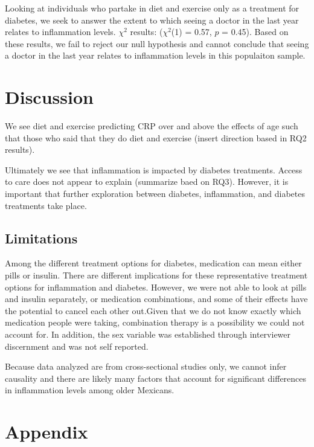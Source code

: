 \documentclass[
  man]{apa6}
\begin{document}
Looking at individuals who partake in diet and exercise only as a treatment for diabetes, we seek to answer the extent to which seeing a doctor in the last year relates to inflammation levels. \(\chi^2\) results: (\(\chi^2\)(1) = 0.57, \(p\) = 0.45). Based on these results, we fail to reject our null hypothesis and cannot conclude that seeing a doctor in the last year relates to inflammation levels in this populaiton sample.

\hypertarget{discussion}{%
\section{Discussion}\label{discussion}}

We see diet and exercise predicting CRP over and above the effects of age such that those who said that they do diet and exercise (insert direction based in RQ2 results).

Ultimately we see that inflammation is impacted by diabetes treatments. Access to care does not appear to explain (summarize baed on RQ3). However, it is important that further exploration between diabetes, inflammation, and diabetes treatments take place.

\hypertarget{limitations}{%
\subsection{Limitations}\label{limitations}}

Among the different treatment options for diabetes, medication can mean either pills or insulin. There are different implications for these representative treatment options for inflammation and diabetes. However, we were not able to look at pills and insulin separately, or medication combinations, and some of their effects have the potential to cancel each other out.Given that we do not know exactly which medication people were taking, combination therapy is a possibility we could not account for. In addition, the sex variable was established through interviewer discernment and was not self reported.

Because data analyzed are from cross-sectional studies only, we cannot infer causality and there are likely many factors that account for significant differences in inflammation levels among older Mexicans.

\newpage

\hypertarget{appendix}{%
\section{Appendix}\label{appendix}}
\end{document}
